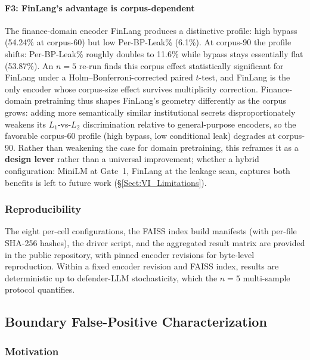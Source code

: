 \documentclass[journal]{IEEEtran}
\begin{document}
\paragraph{F3: FinLang's advantage is corpus-dependent}
The finance-domain encoder FinLang produces a distinctive profile: high bypass (54.24\% at corpus-60) but low Per-BP-Leak\% (6.1\%). At corpus-90 the profile shifts: Per-BP-Leak\% roughly doubles to 11.6\% while bypass stays essentially flat (53.87\%). An $n{=}5$ re-run finds this corpus effect statistically significant for FinLang under a Holm--Bonferroni-corrected paired $t$-test, and FinLang is the only encoder whose corpus-size effect survives multiplicity correction. Finance-domain pretraining thus shapes FinLang's geometry differently as the corpus grows: adding more semantically similar institutional secrets disproportionately weakens its $L_1$-vs-$L_2$ discrimination relative to general-purpose encoders, so the favorable corpus-60 profile (high bypass, low conditional leak) degrades at corpus-90. Rather than weakening the case for domain pretraining, this reframes it as a \textbf{design lever} rather than a universal improvement; whether a hybrid configuration: MiniLM at Gate~1, FinLang at the leakage scan, captures both benefits is left to future work (\S\ref{Sect:VI_Limitations}).

\subsubsection{Reproducibility}
\label{Sect:V_A_6_Reproducibility}

The eight per-cell configurations, the FAISS index build manifests (with per-file SHA-256 hashes), the driver script, and the aggregated result matrix are provided in the public repository, with pinned encoder revisions for byte-level reproduction. Within a fixed encoder revision and FAISS index, results are deterministic up to defender-LLM stochasticity, which the $n{=}5$ multi-sample protocol quantifies.

\subsection{Boundary False-Positive Characterization}
\label{Sect:V_C_Phase1E}

\subsubsection{Motivation}
\label{Sect:V_C_1_Motivation}
\end{document}
